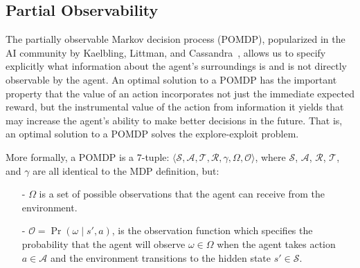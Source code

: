 \documentclass[11pt]{article}
\newcommand\jmnote[1]{\textcolor{red}{James: #1}}
\begin{document}
\subsection{Partial Observability}

The partially observable Markov decision process (POMDP), popularized in the AI community by Kaelbling, Littman, and Cassandra~, allows us to specify explicitly what information about the agent's surroundings 
is and is not directly observable by the agent. An optimal solution to a POMDP has the important property that the value of an action incorporates not just the immediate expected reward, but the instrumental value of the action from information it yields that may increase the agent's ability to make better decisions in the future. That is, an optimal solution to a POMDP solves the explore-exploit problem.  

More formally, a POMDP is a $7$-tuple: $\langle \mathcal{S},\mathcal{A},\mathcal{T},\mathcal{R}, \gamma, \Omega,\mathcal{O} \rangle$, where $\mathcal{S}$, $\mathcal{A}$, $\mathcal{R}$, $\mathcal{T}$, and $\gamma$ are all identical to the MDP definition, but:
\begin{itemize}
\item[-] $\Omega$ is a set of possible observations that the agent can receive from the environment.
\item[-] $\mathcal{O} = \Pr(\omega \mid s', a)$, is the observation function which specifies the probability that the agent will observe $\omega \in \Omega$ when the agent takes action $a \in \mathcal{A}$ and the environment transitions to the hidden state $s' \in \mathcal{S}$.
\end{itemize}
\end{document}
